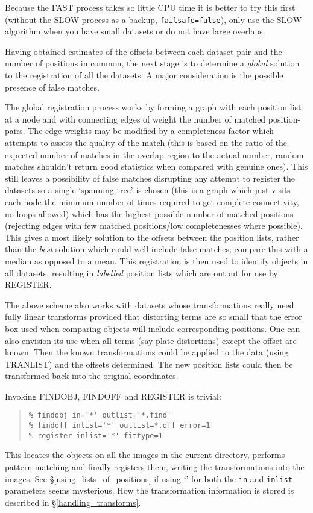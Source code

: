 \documentclass[twoside,11pt]{article}
\newcommand{\hyperref}[4]{#2\ref{#4}#3}
\newcommand{\htmlref}[2]{#1}
\renewcommand{\_}{\texttt{\symbol{95}}}
\newenvironment{myquote}{\begin{quote}\begin{small}}{\end{small}\end{quote}}
\newcommand{\text}[1]{{\small \tt #1}}
\newcommand{\routine}[1]{{\sc #1}}
\newcommand{\xroutine}[1]{\htmlref{{\sc #1}}{#1}}
\begin{document}
Because the FAST process takes so little CPU time it is better to try
this first (without the SLOW process as a backup,
\text{failsafe=false}), only use the SLOW algorithm when you have
small datasets or do not have large overlaps.

Having obtained estimates of the offsets between each dataset pair and
the number of positions in common, the next stage is to determine a
{\em global} solution to the registration of all the datasets. A major
consideration is the possible presence of false matches.

The global registration process works by forming a graph with each
position list at a node and with connecting edges of weight the number
of matched  position-pairs. The edge weights may be modified by a
completeness factor which attempts to assess the quality of the match
(this is based on the ratio of the expected number of matches in the
overlap region to the actual number, random matches shouldn't return
good statistics when compared with genuine ones). This still leaves a
possibility of false matches disrupting any attempt to register the
datasets so a single `spanning tree' is chosen (this is a graph which
just visits each node the minimum number of times required to get
complete connectivity, no loops allowed) which has the highest possible
number of matched positions (rejecting edges with few matched
positions/low completenesses where possible). This gives a most likely
solution to the offsets between the position lists, rather than the
{\em best} solution which could well include false matches; compare this
with a median as opposed to a mean. This registration is then used to
identify objects in all datasets, resulting in {\em labelled} position
lists which are output for use by \routine{REGISTER}.

The above scheme also works with datasets whose transformations really
need fully linear transforms provided that distorting terms are so small
that the error box used when comparing objects will include
corresponding positions. One can also envision its use when all terms
(say plate distortions) except the offset are known. Then the known
transformations could be applied to the data (using \xroutine{TRANLIST}) and the
offsets determined. The new position lists could then be transformed
back into the original coordinates.

Invoking \xroutine{FINDOBJ}, \xroutine{FINDOFF} and
\xroutine{REGISTER} is trivial:
\begin{myquote}
\begin{verbatim}
% findobj in='*' outlist='*.find'
% findoff inlist='*' outlist=*.off error=1
% register inlist='*' fittype=1
\end{verbatim}
\end{myquote}
This locates the objects on all the images in the current directory,
performs pattern-matching and finally registers them, writing the
transformations into the images.
See \hyperref{``using lists of positions''}{\S}{}{using_lists_of_positions}
if using `\text{*}' for both the \text{in} and \text{inlist}
parameters seems mysterious.
How the transformation information is stored is described in
\hyperref{``handling transforms''}{\S}{}{handling_transforms}.
\end{document}

